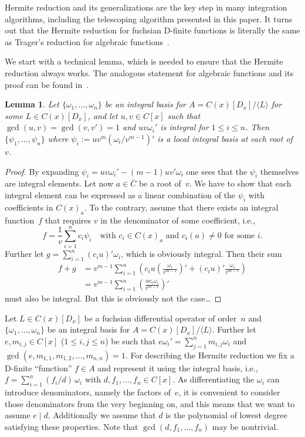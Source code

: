 \documentclass{sig-alternate}
\newtheorem{lemma}[theorem]{Lemma}
\def\<#1>{\langle#1\rangle}
\begin{document}
Hermite reduction and its generalizations are the key step in many integration
algorithms, including the telescoping algorithm presented in this paper. It
turns out that the Hermite reduction for fuchsian D-finite functions is
literally the same as Trager's reduction for algebraic
functions~\cite{trager84}.

We start with a technical lemma, which is needed to ensure that the Hermite
reduction always works. The analogous statement for algebraic functions and
its proof can be found in~\cite[pp. 46--47]{trager84}.
\begin{lemma}\label{lemma:ibv}
Let $\{\omega_1,\ldots,\omega_n\}$ be an integral basis for $A=C(x)[D_x]/\<L>$
for some $L\in C(x)[D_x]$, and let $u,v\in C[x]$ such that
$\gcd(u,v)=\gcd(v,v')=1$ and $uv\omega_i'$ is integral for $1\leq i\leq n$.
Then $\{\psi_1,\ldots,\psi_n\}$ where $\psi_i:=uv^m(\omega_i/v^{m-1})'$ is a
local integral basis at each root of~$v$.
\end{lemma}
\begin{proof}
By expanding $\psi_i=uv\omega_i'-(m-1)uv'\omega_i$ one sees that the $\psi_i$
themselves are integral elements. Let now $a\in\bar{C}$ be a root of~$v$. We
have to show that each integral element can be expressed as a linear
combination of the $\psi_i$ with coefficients in $C(x)_a$. To the contrary,
assume that there exists an integral function~$f$ that requires $v$ in the
denominator of some coefficient, i.e.,
\[
  f = \frac{1}{v} \sum_{i=1}^n c_i \psi_i \quad\text{with }c_i\in C(x)_a
  \text{ and } c_i(a)\neq0 \text{ for some } i.
\]
Further let $g=\sum_{i=1}^n (c_iu)'\omega_i$, which is obviously integral. Then
their sum
\begin{align*}
  f+g &= v^{m-1} \sum_{i=1}^n \left(c_iu \left(\frac{\omega_i}{v^{m-1}}\right)'
  + (c_iu)'\frac{\omega_i}{v^{m-1}} \right) \\
  &= v^{m-1} \sum_{i=1}^n \left(\frac{uc_i\omega_i}{v^{m-1}}\right)'
\end{align*}
must also be integral. But this is obviously not the case\dots
\end{proof}

Let $L\in C(x)[D_x]$ be a fuchsian differential operator of order~$n$ and
$\{\omega_1,\ldots,\omega_n\}$ be an integral basis for $A=C(x)[D_x]/\<L>$.
Further let $e,m_{i,j}\in C[x]$ ($1\leq i,j\leq n$) be such that
$e\omega_i'=\sum_{j=1}^n m_{i,j}\omega_i$ and
$\gcd(e,m_{1,1},m_{1,2},\ldots,m_{n,n})=1$. For describing the Hermite
reduction we fix a D-finite ``function'' $f\in A$ and represent it using the
integral basis, i.e., $f=\sum_{i=1}^n (f_i/d)\,\omega_i$ with
$d,f_1,\ldots,f_n\in C[x]$. As differentiating the $\omega_i$ can introduce
denominators, namely the factors of~$e$, it is convenient to consider those
denominators from the very beginning on, and this means that we want to assume
$e\mid d$. Additionally we assume that $d$ is the polynomial of lowest degree
satisfying these properties. %
Note that $\gcd(d,f_1,\ldots,f_n)$ may be nontrivial.
\end{document}
